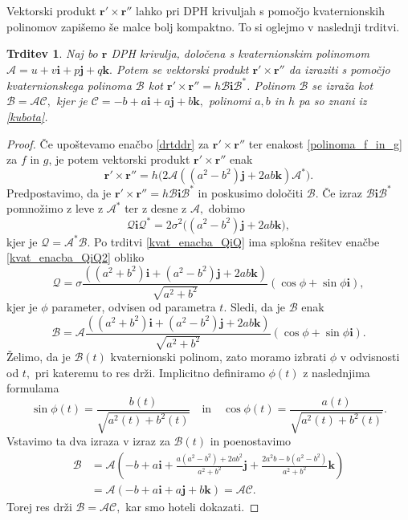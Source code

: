\documentclass[12pt,a4paper,twoside]{article}
\theoremstyle{definition} %
\theoremstyle{plain} %
\newtheorem{trditev}[definicija]{Trditev}
\theoremstyle{primerstyle}
\numberwithin{equation}{section}  %
\newcommand{\rV}{\mathbf{r}}
\newcommand{\iV}{\mathbf{i}}
\newcommand{\jV}{\mathbf{j}}
\newcommand{\kV}{\mathbf{k}}
\newcommand{\AQ}{\mathcal{A}}
\newcommand{\BQ}{\mathcal{B}}
\newcommand{\CQ}{\mathcal{C}}
\newcommand{\QQ}{\mathcal{Q}}
\begin{document}
Vektorski produkt $\rV'\times\rV''$ lahko pri DPH krivuljah s pomočjo kvaternionskih polinomov zapišemo še malce bolj kompaktno. To si oglejmo v naslednji trditvi.
\begin{trditev}
	\label{drtddr_za_DPH}
	Naj bo $\rV$ DPH krivulja, določena s kvaternionskim polinomom $\AQ=u+v\iV+p\jV+q\kV.$ Potem se vektorski produkt $\rV'\times\rV''$ da izraziti s pomočjo kvaternionskega polinoma $\BQ$ kot $\rV'\times\rV''=h\BQ\iV\BQ^*$. Polinom $\BQ$ se izraža kot $\BQ=\AQ\CQ,$ kjer je $\CQ=-b+a\iV+a\jV+b\kV,$ polinomi $a,b$ in $h$ pa so znani iz \eqref{kubota}.
\end{trditev}
\begin{proof}
	Če upoštevamo enačbo \eqref{drtddr} za $\rV'\times\rV''$ ter enakost \eqref{polinoma_f_in_g} za $f$ in $g$, je potem vektorski produkt $\rV'\times\rV''$ enak
	\begin{equation}
		\rV'\times\rV''=h\big(2\AQ((a^2-b^2)\jV+2ab\kV)\AQ^*\big).
	\end{equation}
	Predpostavimo, da je $\rV'\times\rV''=h\BQ\iV\BQ^*$ in poskusimo določiti $\BQ.$ Če izraz $\BQ\iV\BQ^*$ pomnožimo z leve z $\AQ^*$ ter z desne z $\AQ,$ dobimo
	\begin{equation}
		\label{kvat_enacba_QiQ2}
		\QQ\iV\QQ^*=2\sigma^2\big((a^2-b^2)\jV+2ab\kV\big),
	\end{equation}
	kjer je $\QQ=\AQ^*\BQ.$ Po trditvi \ref{kvat_enacba_QiQ} ima splošna rešitev enačbe \eqref{kvat_enacba_QiQ2} obliko
	\begin{equation*}
		\QQ=\sigma\frac{((a^2+b^2)\iV+(a^2-b^2)\jV+2ab\kV)}{\sqrt{a^2+b^2}}(\cos\phi+\sin\phi\iV),
	\end{equation*}
	kjer je $\phi$ parameter, odvisen od parametra $t.$ Sledi, da je $\BQ$ enak
	\begin{equation*}
		\BQ=\AQ\frac{((a^2+b^2)\iV+(a^2-b^2)\jV+2ab\kV)}{\sqrt{a^2+b^2}}(\cos\phi+\sin\phi\iV).
	\end{equation*}
	Želimo, da je $\BQ(t)$ kvaternionski polinom, zato moramo izbrati  $\phi$ v odvisnosti od $t,$ pri kateremu to res drži. Implicitno definiramo $\phi(t)$ z naslednjima formulama
	\begin{equation*}
		\sin\phi(t)=\frac{b(t)}{\sqrt{a^2(t)+b^2(t)}}\quad\text{in}\quad\cos\phi(t)=\frac{a(t)}{\sqrt{a^2(t)+b^2(t)}}.
	\end{equation*}
	Vstavimo ta dva izraza v izraz za $\BQ(t)$ in poenostavimo
	\begin{align*}
		\BQ&=\AQ\left(-b+a\iV+\frac{a(a^2-b^2)+2ab^2}{a^2+b^2}\jV+\frac{2a^2b-b(a^2-b^2)}{a^2+b^2}\kV\right)\\
		&=\AQ(-b+a\iV+a\jV+b\kV)=\AQ\CQ.
	\end{align*}
	Torej res drži $\BQ=\AQ\CQ,$ kar smo hoteli dokazati.
\end{proof}
\end{document}
